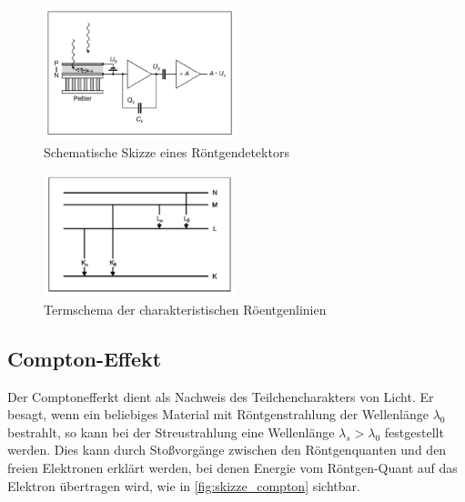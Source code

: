 \documentclass[12pt,english,ngerman]{scrartcl}
\begin{document}

\begin{figure}[H]
	\begin{center}
		\includegraphics[width =0.5\textwidth]{./figures/skizze_roentgendetektor.PNG}
	\end{center}
	\caption[Schematische Skizze eines Röntgendetektors]
	{Schematische Skizze eines Röntgendetektors
	\cite{unterlagen_rontgenfluorenzenz}
	}\label{fig:skizze_roetgendetektor}
\end{figure}


\begin{figure}[H]
	\begin{center}
		\includegraphics[width =0.5\textwidth]{./figures/termschema_roentgenlinien.PNG}
	\end{center}
	\caption[Termschema der charakteristischen Röentgenlinien]
	{Termschema der charakteristischen Röentgenlinien
	\cite{unterlagen_rontgenfluorenzenz}
	}\label{fig:termschema_roentgenlinien}
\end{figure}

\subsection{Compton-Effekt}

Der Comptonefferkt dient als Nachweis des Teilchencharakters von Licht. Er besagt, wenn
ein beliebiges Material mit Röntgenstrahlung der Wellenlänge $\lambda_0$ bestrahlt, so kann bei der
Streustrahlung eine Wellenlänge $\lambda_s > \lambda_0$ festgestellt werden.
Dies kann durch Stoßvorgänge zwischen den Röntgenquanten und den freien Elektronen erklärt werden,
bei denen Energie vom Röntgen-Quant auf das Elektron übertragen wird, wie in \autoref{fig:skizze_compton} sichtbar.
\end{document}
